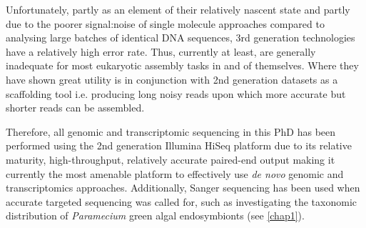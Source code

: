 
Unfortunately, partly as an element of their relatively nascent state and partly due to the
poorer signal:noise of single molecule approaches compared to analysing large 
batches of identical DNA sequences, 3rd generation technologies have a relatively high error rate.
Thus, currently at least, are generally inadequate for most eukaryotic assembly tasks in and of themselves.
Where they have shown great utility is in conjunction with 2nd generation datasets
as a scaffolding tool i.e. producing long noisy reads upon which more accurate but shorter
reads can be assembled.


Therefore, all genomic and transcriptomic sequencing in this PhD has been performed using the 2nd generation
Illumina HiSeq platform due to its relative maturity, high-throughput, relatively accurate
paired-end output making it currently the most amenable platform to effectively
use \textit{de novo} genomic and transcriptomics approaches.  Additionally, Sanger sequencing
has been used when accurate targeted sequencing was called for, such as investigating the
taxonomic distribution of \textit{Paramecium} green algal endosymbionts (see \ref{chap1}).


